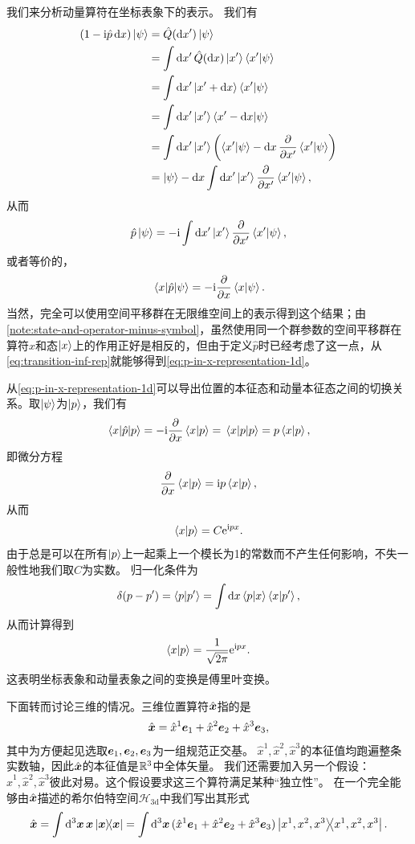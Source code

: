 我们来分析动量算符在坐标表象下的表示。
我们有
\[
    \begin{aligned}
        (1 - \mathrm{i} \hat{p} \dd{x}) \ket{\psi} &= \hat{Q}(\dd{x'}) \ket{\psi} \\
        &= \int \dd{x'} \hat{Q}(\dd{x}) \ket{x'} \braket{x'}{\psi} \\
        &= \int \dd{x'} \ket{x' + \dd{x}} \braket{x'}{\psi} \\
        &= \int \dd{x'} \ket{x'} \braket{x' - \dd{x}}{\psi} \\
        &= \int \dd{x'} \ket{x'} \left(\braket{x'}{\psi} - \dd{x} \pdv{x'} \braket{x'}{\psi} \right) \\
        &= \ket{\psi} - \dd{x} \int \dd{x'} \ket{x'} \pdv{x'} \braket{x'}{\psi}, 
    \end{aligned}
\]
从而
\begin{equation}
    \hat{p} \ket{\psi} = - \mathrm{i} \int \dd{x'} \ket{x'} \pdv{x'} \braket{x'}{\psi},
\end{equation}
或者等价的，
\begin{equation}
    \mel{x}{\hat{p}}{\psi} = - \mathrm{i} \pdv{x} \braket{x}{\psi}.
    \label{eq:p-in-x-representation-1d}
\end{equation}
当然，完全可以使用空间平移群在无限维空间上的表示得到这个结果；由\autoref{note:state-and-operator-minus-symbol}，虽然使用同一个群参数的空间平移群在算符$\hat{x}$和态$\ket{x}$上的作用正好是相反的，但由于定义$\hat{p}$时已经考虑了这一点，从\eqref{eq:transition-inf-rep}就能够得到\eqref{eq:p-in-x-representation-1d}。

从\eqref{eq:p-in-x-representation-1d}可以导出位置的本征态和动量本征态之间的切换关系。取$\ket{\psi}$为$\ket{p}$，我们有
\[
    \mel{x}{\hat{p}}{p} = - \mathrm{i} \pdv{x} \braket{x}{p} = \mel{x}{p}{p} = p \braket{x}{p},
\]
即微分方程
\[
    \pdv{x} \braket{x}{p} = \mathrm{i} p \braket{x}{p},
\]
从而
\[
    \braket{x}{p} = C \mathrm{e}^{\mathrm{i} p x}.
\]
由于总是可以在所有$\ket{p}$上一起乘上一个模长为1的常数而不产生任何影响，不失一般性地我们取$C$为实数。
归一化条件为
\[
    \delta(p - p') = \braket{p}{p'} = \int \dd{x} \braket{p}{x} \braket{x}{p'},
\]
从而计算得到
\begin{equation}
    \braket{x}{p} = \frac{1}{\sqrt{2\pi}} \mathrm{e}^{\mathrm{i} p x}.
\end{equation}
这表明坐标表象和动量表象之间的变换是傅里叶变换。

下面转而讨论三维的情况。三维位置算符$\hat{\vb*{x}}$指的是
\begin{equation}
    \hat{\vb*{x}} = \hat{x}^1 \vb*{e}_1 + \hat{x}^2 \vb*{e}_2 + \hat{x}^3 \vb*{e}_3,
\end{equation}
其中为方便起见选取$\vb*{e}_1, \vb*{e}_2, \vb*{e}_3$为一组规范正交基。
$\hat{x}^1, \hat{x}^2, \hat{x}^3$的本征值均跑遍整条实数轴，因此$\hat{\vb*{x}}$的本征值是$\mathbb{R}^3$中全体矢量。
我们还需要加入另一个假设：$\hat{x}^1, \hat{x}^2, \hat{x}^3$彼此对易。这个假设要求这三个算符满足某种“独立性”。
在一个完全能够由$\hat{\vb*{x}}$描述的希尔伯特空间$\mathcal{H}_{3\text{d}}$中我们写出其形式
\begin{equation}
    \hat{\vb*{x}} = \int \dd[3]{\vb*{x}} \vb*{x} \dyad{\vb*{x}} 
    = \int \dd[3]{\vb*{x}} (\hat{x}^1 \vb*{e}_1 + \hat{x}^2 \vb*{e}_2 + \hat{x}^3 \vb*{e}_3) \dyad{x^1, x^2, x^3}.
\end{equation}

